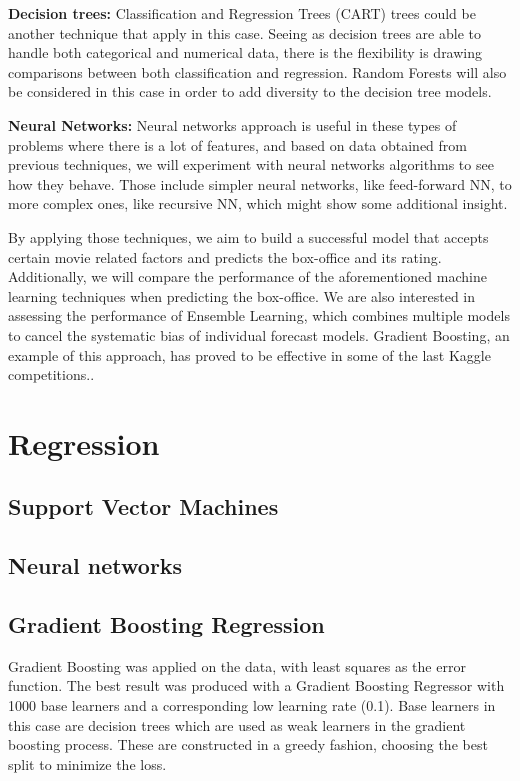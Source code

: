 \textbf{Decision trees:}
Classification and Regression Trees (CART) trees could be another technique that apply in this case. Seeing as decision trees are able to handle both categorical and numerical data, there is the flexibility is drawing comparisons between both classification and regression.  Random Forests will also be considered in this case in order to add diversity to the decision tree models. 

\textbf{Neural Networks:}
Neural networks approach is useful in these types of problems where there is a lot of features, and based on data obtained from previous techniques, we will experiment with neural networks algorithms to see how they behave. Those include simpler neural networks, like feed-forward NN, to more complex ones, like recursive NN, which might show some additional insight.

By applying those techniques, we aim to build a successful model that accepts certain movie related factors and predicts the box-office and its rating. Additionally, we will compare the performance of the aforementioned machine learning techniques when predicting the box-office. We are also interested in assessing the performance of Ensemble Learning, which combines multiple models to cancel the systematic bias of individual forecast models. Gradient Boosting, an example of this approach, has proved to be effective in some of the last Kaggle competitions..
\section{Regression}
\subsection{Support Vector Machines}
\subsection{Neural networks}
\subsection{Gradient Boosting Regression}
Gradient Boosting was applied on the data, with least squares as the error function. The best result was produced with a Gradient Boosting Regressor with 1000 base learners and a corresponding low learning rate (0.1). Base learners in this case are decision trees which are used as weak learners in the gradient boosting process. These are constructed in a greedy fashion, choosing the best split to minimize the loss. 

